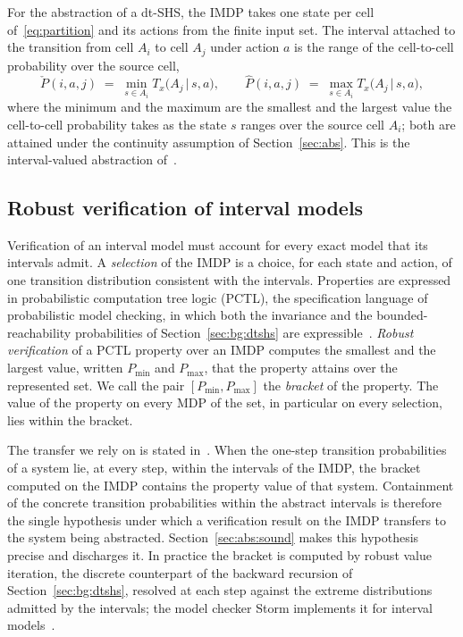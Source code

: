 \documentclass[11pt,a4paper]{article}
\theoremstyle{plain}
\theoremstyle{remark}
\begin{document}
	For the abstraction of a dt-SHS, the IMDP takes one state per cell of~\eqref{eq:partition} and its actions from the finite input set. The interval attached to the transition from cell $A_i$ to cell $A_j$ under action $a$ is the range of the cell-to-cell probability over the source cell,
	\begin{equation}
		\check P(i, a, j) \;=\; \min_{s \in A_i} T_x\bigl(A_j \,\big|\, s, a\bigr), \qquad
		\hat P(i, a, j) \;=\; \max_{s \in A_i} T_x\bigl(A_j \,\big|\, s, a\bigr),
		\label{eq:extrema}
	\end{equation}
	where the minimum and the maximum are the smallest and the largest value the cell-to-cell probability takes as the state $s$ ranges over the source cell $A_i$; both are attained under the continuity assumption of Section~\ref{sec:abs}. This is the interval-valued abstraction of~\cite{LAB15}.
	
	\subsection{Robust verification of interval models}
	\label{sec:bg:robust}
	
	Verification of an interval model must account for every exact model that its intervals admit. A \emph{selection} of the IMDP is a choice, for each state and action, of one transition distribution consistent with the intervals. Properties are expressed in probabilistic computation tree logic (PCTL), the specification language of probabilistic model checking, in which both the invariance and the bounded-reachability probabilities of Section~\ref{sec:bg:dtshs} are expressible~\cite{KNP25}. \emph{Robust verification} of a PCTL property over an IMDP computes the smallest and the largest value, written $P_{\min}$ and $P_{\max}$, that the property attains over the represented set. We call the pair $[P_{\min}, P_{\max}]$ the \emph{bracket} of the property. The value of the property on every MDP of the set, in particular on every selection, lies within the bracket.
	
	The transfer we rely on is stated in~\cite{LAB15}. When the one-step transition probabilities of a system lie, at every step, within the intervals of the IMDP, the bracket computed on the IMDP contains the property value of that system. Containment of the concrete transition probabilities within the abstract intervals is therefore the single hypothesis under which a verification result on the IMDP transfers to the system being abstracted. Section~\ref{sec:abs:sound} makes this hypothesis precise and discharges it.
	In practice the bracket is computed by robust value iteration, the discrete counterpart of the backward recursion of Section~\ref{sec:bg:dtshs}, resolved at each step against the extreme distributions admitted by the intervals; the model checker Storm implements it for interval models~\cite{Storm}.
\end{document}
